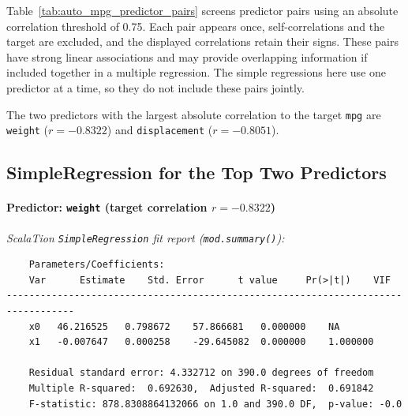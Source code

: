 Table~\ref{tab:auto_mpg_predictor_pairs} screens predictor pairs using an absolute correlation threshold of 0.75. Each pair appears once, self-correlations and the target are excluded, and the displayed correlations retain their signs. These pairs have strong linear associations and may provide overlapping information if included together in a multiple regression. The simple regressions here use one predictor at a time, so they do not include these pairs jointly.

The two predictors with the largest absolute correlation to the target \texttt{mpg} are \texttt{weight} ($r=-0.8322$) and \texttt{displacement} ($r=-0.8051$).

\subsection{SimpleRegression for the Top Two Predictors}

\paragraph{Predictor: \texttt{weight} (target correlation $r = -0.8322$)}

\textit{ScalaTion \texttt{SimpleRegression} fit report (\texttt{mod.summary()}):}
\begin{verbatim}
    Parameters/Coefficients:
    Var      Estimate    Std. Error 	 t value 	 Pr(>|t|) 	 VIF
----------------------------------------------------------------------------------
    x0	 46.216525	 0.798672	 57.866681	 0.000000	 NA
    x1	 -0.007647	 0.000258	 -29.645082	 0.000000	 1.000000

    Residual standard error: 4.332712 on 390.0 degrees of freedom
    Multiple R-squared:  0.692630,	Adjusted R-squared:  0.691842
    F-statistic: 878.8308864132066 on 1.0 and 390.0 DF,  p-value: -0.0
\end{verbatim}

